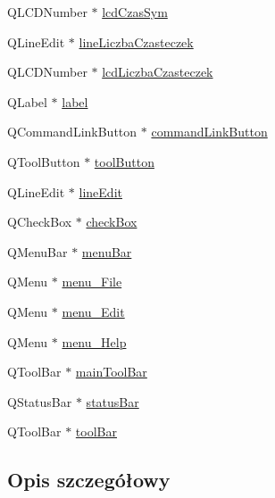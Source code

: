 \begin{DoxyCompactItemize}
\item 
Q\+L\+C\+D\+Number $\ast$ \hyperlink{class_ui___d_main_window_af49335a21dc17e53674f8b62a640ca2d}{lcd\+Czas\+Sym}
\item 
Q\+Line\+Edit $\ast$ \hyperlink{class_ui___d_main_window_a49c95cda7e035087a4367514e5540298}{line\+Liczba\+Czasteczek}
\item 
Q\+L\+C\+D\+Number $\ast$ \hyperlink{class_ui___d_main_window_a3d6afe29d882b3a9119b68d79c9b5e0f}{lcd\+Liczba\+Czasteczek}
\item 
Q\+Label $\ast$ \hyperlink{class_ui___d_main_window_aa528e417bc72cda19dfcea49f1617b2a}{label}
\item 
Q\+Command\+Link\+Button $\ast$ \hyperlink{class_ui___d_main_window_a0d790fbf37bac850b60a7cb42d100315}{command\+Link\+Button}
\item 
Q\+Tool\+Button $\ast$ \hyperlink{class_ui___d_main_window_a97093acead8089d7f4b26fab4b1c8a65}{tool\+Button}
\item 
Q\+Line\+Edit $\ast$ \hyperlink{class_ui___d_main_window_a26b955a365ed5865f327921708f1a72f}{line\+Edit}
\item 
Q\+Check\+Box $\ast$ \hyperlink{class_ui___d_main_window_a41e765e074811602fbc5efecf07011ac}{check\+Box}
\item 
Q\+Menu\+Bar $\ast$ \hyperlink{class_ui___d_main_window_a788ef749d82ca070e467e55cca0d47dd}{menu\+Bar}
\item 
Q\+Menu $\ast$ \hyperlink{class_ui___d_main_window_a991f4d15852faf04d8c12694b3e077ad}{menu\+\_\+\+File}
\item 
Q\+Menu $\ast$ \hyperlink{class_ui___d_main_window_a8826a3e34a5aa75fca2b8e45b7010a8b}{menu\+\_\+\+Edit}
\item 
Q\+Menu $\ast$ \hyperlink{class_ui___d_main_window_ac2997077098614d72b21d29c7a48350c}{menu\+\_\+\+Help}
\item 
Q\+Tool\+Bar $\ast$ \hyperlink{class_ui___d_main_window_a2e1da3781ee1e5913b25b85f4c29b97f}{main\+Tool\+Bar}
\item 
Q\+Status\+Bar $\ast$ \hyperlink{class_ui___d_main_window_ac9e025e7279839dd7ab1686456d1ae21}{status\+Bar}
\item 
Q\+Tool\+Bar $\ast$ \hyperlink{class_ui___d_main_window_abba1dae1dd835c7a7dd39da623cd4580}{tool\+Bar}
\end{DoxyCompactItemize}


\subsection{Opis szczegółowy}


